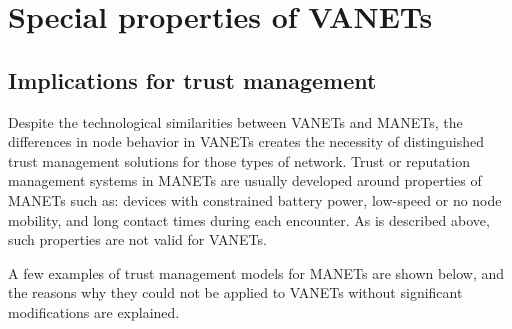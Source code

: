 \chapter{Special properties of VANETs}
\label{chap:socialvanets}



\section{Implications for trust management}

Despite the technological similarities between VANETs and MANETs, the differences in node behavior in VANETs creates the necessity of distinguished trust management solutions for those types of network.
Trust or reputation management systems in MANETs are usually developed around properties of MANETs such as: devices with constrained battery power, low-speed or no node mobility, and long contact times during each encounter.
As is described above, such properties are not valid for VANETs.



A few examples of trust management models for MANETs are shown below, and the reasons why they could not be applied to VANETs without significant modifications are explained.

